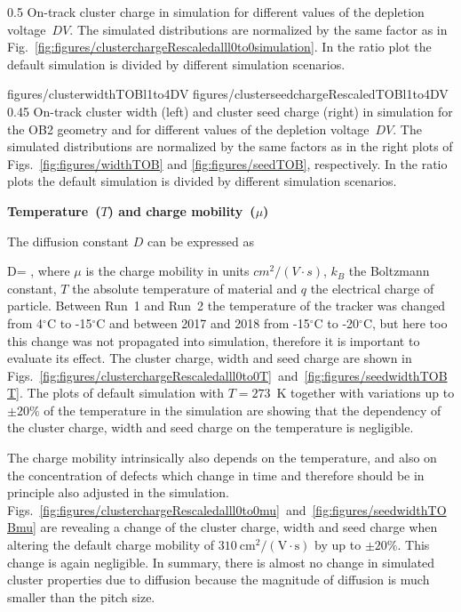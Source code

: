                  {0.5}       %
                 {  On-track cluster charge in simulation for different values of the depletion voltage~$DV$.   The simulated distributions are normalized by the same factor as in Fig.~\ref{fig:figures/clusterchargeRescaledalll0to0simulation}.  In the ratio plot the default simulation is divided by different simulation scenarios. }

                 {figures/clusterwidthTOBl1to4DV}
                 {figures/clusterseedchargeRescaledTOBl1to4DV} %
                 {0.45}       %
                 {  On-track cluster width (left) and cluster seed charge (right) in simulation  for the OB2 geometry and for different values of the depletion voltage~$DV$.  The simulated distributions are normalized by the same factors as in the right plots of Figs.~\ref{fig:figures/widthTOB} and \ref{fig:figures/seedTOB}, respectively.   In the ratio plots the default simulation is divided by different simulation scenarios. }

\textbf{Temperature~($T$) and charge mobility~($\mu$)}

The diffusion constant $D$ can be expressed as

{
   D=  ,
}
where $\mu$ is the charge mobility in units $cm^{2}/(V \cdot s)$, $k_{B}$ the Boltzmann constant, $T$ the absolute temperature of material and $q$ the electrical charge of particle. Between Run~1 and Run~2 the temperature of the tracker was changed from 4$^{\circ}$C to -15$^{\circ}$C and between 2017 and 2018 from -15$^{\circ}$C to -20$^{\circ}$C, but here too this change was not propagated into simulation, therefore it is important to evaluate its effect. The cluster charge, width and seed charge are shown in Figs.~\ref{fig:figures/clusterchargeRescaledalll0to0T}~and~\ref{fig:figures/seedwidthTOBT}. The plots of default simulation with $T=273$~K together with variations up to $\pm 20\%$ of the temperature in the simulation are showing that the dependency of the cluster charge, width and seed charge on the temperature is negligible. 

The charge mobility intrinsically also depends on the temperature, and also on the concentration of defects which change in time and therefore should be in principle also adjusted in the simulation. Figs.~\ref{fig:figures/clusterchargeRescaledalll0to0mu}~and~\ref{fig:figures/seedwidthTOBmu} are revealing a change of the cluster charge, width and seed charge when altering the default charge mobility of $310~\mathrm{cm^2/(V \cdot s)}$ by up to $\pm 20\%$. This change is again negligible. In summary, there is almost no change in simulated cluster properties due to diffusion because the magnitude of diffusion is much smaller than the pitch size.


